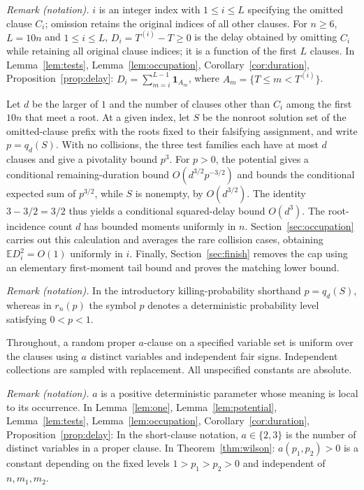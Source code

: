 \documentclass[11pt]{article}
\theoremstyle{remark}
\newcommand{\E}{\mathbb E}
\newcommand{\ind}{\mathbf 1}
\numberwithin{equation}{section}
\begin{document}
\noindent\textit{Remark (notation).} $i$ is an integer index with $1\le i\le L$ specifying the omitted clause $C_i$; omission retains the original indices of all other clauses. For $n\ge6$, $L=10n$ and $1\le i\le L$, $D_i=T^{(i)}-T\ge0$ is the delay obtained by omitting $C_i$ while retaining all original clause indices; it is a function of the first $L$ clauses. In Lemma~\ref{lem:tests}, Lemma~\ref{lem:occupation}, Corollary~\ref{cor:duration}, Proposition~\ref{prop:delay}: $D_i=\sum_{m=i}^{L-1}\ind_{A_m}$, where $A_m=\{T\le m<T^{(i)}\}$.


Let $d$ be the larger of $1$ and the number of clauses other than $C_i$
among the first $10n$ that meet a root. At a given index, let $S$ be
the nonroot solution set of the omitted-clause prefix with the roots
fixed to their falsifying assignment, and write $p=q_d(S)$.
With no collisions, the three test
families each have at most $d$ clauses and give a pivotality bound $p^3$.
For $p>0$, the potential gives a conditional remaining-duration bound
$O(d^{3/2}p^{-3/2})$ and bounds the conditional expected sum of $p^{3/2}$,
while $S$ is nonempty, by $O(d^{3/2})$.
The identity $3-3/2=3/2$ thus yields a
conditional squared-delay bound $O(d^3)$. The root-incidence count $d$
has bounded moments uniformly in $n$. Section~\ref{sec:occupation}
carries out this calculation and averages the rare collision cases,
obtaining $\E D_i^2=O(1)$ uniformly in $i$.
Finally, Section~\ref{sec:finish} removes the cap using an elementary
first-moment tail bound and proves the matching lower bound.

\noindent\textit{Remark (notation).} In the introductory killing-probability shorthand $p=q_d(S)$, whereas in $r_n(p)$ the symbol $p$ denotes a deterministic probability level satisfying $0<p<1$.


Throughout, a random proper $a$-clause on a specified variable set is
uniform over the clauses using $a$ distinct variables and independent
fair signs. Independent collections are sampled with replacement.
All unspecified constants are absolute.

\noindent\textit{Remark (notation).} $a$ is a positive deterministic parameter whose meaning is local to its occurrence. In Lemma~\ref{lem:one}, Lemma~\ref{lem:potential}, Lemma~\ref{lem:tests}, Lemma~\ref{lem:occupation}, Corollary~\ref{cor:duration}, Proposition~\ref{prop:delay}: In the short-clause notation, $a\in\{2,3\}$ is the number of distinct variables in a proper clause. In Theorem~\ref{thm:wilson}: $a(p_1,p_2)>0$ is a constant depending on the fixed levels $1>p_1>p_2>0$ and independent of $n,m_1,m_2$.
\end{document}
